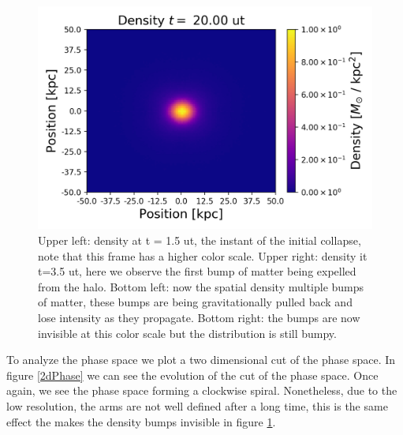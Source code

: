 \begin{figure}[h!]
    \includegraphics[scale=0.45]{imag/2dDens40.png}
    \caption{Upper left: density at t = 1.5 ut, the instant of the initial collapse, note that this frame has a higher color scale. Upper right: density it t=3.5 ut, here we observe the first bump of matter being expelled from the halo. Bottom left: now the spatial density multiple bumps of matter, these bumps are being gravitationally pulled back and lose intensity as they propagate. Bottom right: the bumps are now invisible at this color scale but the distribution is still bumpy. }
    \label{2dDens}
\end{figure}



To analyze the phase space we plot a two dimensional cut of the phase space. In figure \ref{2dPhase} we can see the evolution of the cut of the phase space. Once again, we see the phase space forming a clockwise spiral. Nonetheless, due to the low resolution, the arms are not well defined after a long time, this is the same effect the makes the density bumps invisible in figure \ref{2dDens}.

